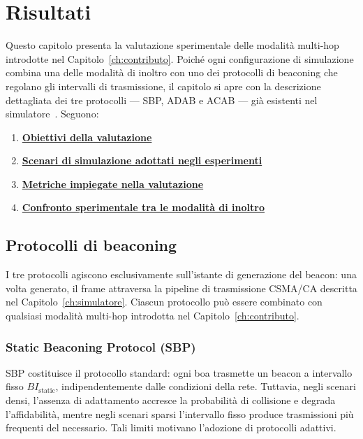 \chapter{Risultati}
\label{ch:risultati}

Questo capitolo presenta la valutazione sperimentale delle modalit\`a multi-hop
introdotte nel Capitolo~\ref{ch:contributo}. Poich\'e ogni configurazione
di simulazione combina una delle modalit\`a di inoltro con uno dei protocolli di
beaconing che regolano gli intervalli di trasmissione, il capitolo si apre con
la descrizione dettagliata dei tre protocolli --- SBP, ADAB e ACAB --- gi\`a esistenti nel
simulatore~\cite{prosafe}. Seguono:
\begin{enumerate}
    \item \hyperref[sec:eval-goals]{\textbf{Obiettivi della valutazione}}
    \item \hyperref[sec:eval-setup]{\textbf{Scenari di simulazione adottati negli esperimenti}}
    \item \hyperref[sec:eval-metrics]{\textbf{Metriche impiegate nella valutazione}}
    \item \hyperref[sec:confronto]{\textbf{Confronto sperimentale tra le modalit\`a di inoltro}}
\end{enumerate}

\section{Protocolli di beaconing}
\label{sec:beaconing}
I tre protocolli agiscono esclusivamente sull'istante di generazione del
beacon: una volta generato, il frame attraversa la pipeline di trasmissione
CSMA/CA descritta nel Capitolo~\ref{ch:simulatore}. Ciascun protocollo pu\`o
essere combinato con qualsiasi modalit\`a multi-hop introdotta nel
Capitolo~\ref{ch:contributo}.

\subsection{Static Beaconing Protocol (SBP)}
\label{sec:sbp}
SBP costituisce il protocollo standard: ogni boa trasmette un beacon a
intervallo fisso $BI_{\text{static}}$, indipendentemente dalle condizioni della
rete. Tuttavia, negli scenari densi, l'assenza di adattamento
accresce la probabilit\`a di collisione e degrada l'affidabilit\`a, mentre negli
scenari sparsi l'intervallo fisso produce trasmissioni pi\`u frequenti del
necessario. Tali limiti motivano l'adozione di protocolli adattivi.

